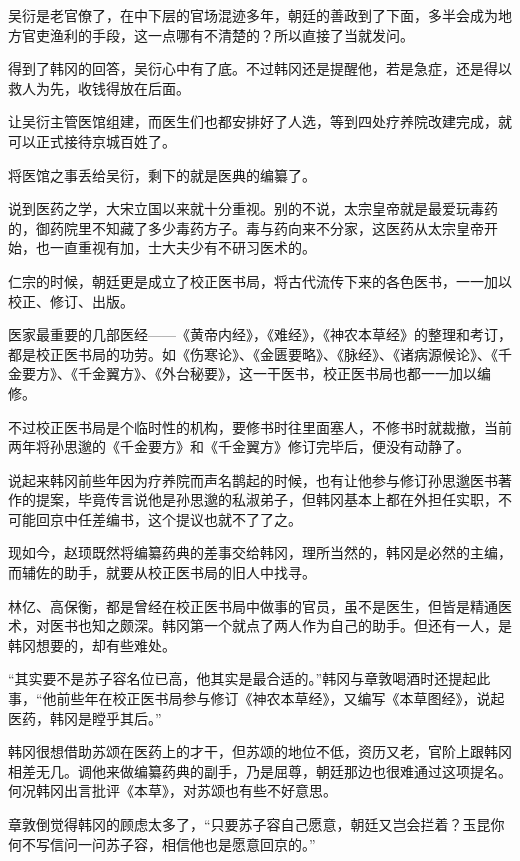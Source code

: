 吴衍是老官僚了，在中下层的官场混迹多年，朝廷的善政到了下面，多半会成为地方官吏渔利的手段，这一点哪有不清楚的？所以直接了当就发问。

得到了韩冈的回答，吴衍心中有了底。不过韩冈还是提醒他，若是急症，还是得以救人为先，收钱得放在后面。

让吴衍主管医馆组建，而医生们也都安排好了人选，等到四处疗养院改建完成，就可以正式接待京城百姓了。

将医馆之事丢给吴衍，剩下的就是医典的编纂了。

说到医药之学，大宋立国以来就十分重视。别的不说，太宗皇帝就是最爱玩毒药的，御药院里不知藏了多少毒药方子。毒与药向来不分家，这医药从太宗皇帝开始，也一直重视有加，士大夫少有不研习医术的。

仁宗的时候，朝廷更是成立了校正医书局，将古代流传下来的各色医书，一一加以校正、修订、出版。

医家最重要的几部医经——《黄帝内经》，《难经》，《神农本草经》的整理和考订，都是校正医书局的功劳。如《伤寒论》、《金匮要略》、《脉经》、《诸病源候论》、《千金要方》、《千金翼方》、《外台秘要》，这一干医书，校正医书局也都一一加以编修。

不过校正医书局是个临时性的机构，要修书时往里面塞人，不修书时就裁撤，当前两年将孙思邈的《千金要方》和《千金翼方》修订完毕后，便没有动静了。

说起来韩冈前些年因为疗养院而声名鹊起的时候，也有让他参与修订孙思邈医书著作的提案，毕竟传言说他是孙思邈的私淑弟子，但韩冈基本上都在外担任实职，不可能回京中任差编书，这个提议也就不了了之。

现如今，赵顼既然将编纂药典的差事交给韩冈，理所当然的，韩冈是必然的主编，而辅佐的助手，就要从校正医书局的旧人中找寻。

林亿、高保衡，都是曾经在校正医书局中做事的官员，虽不是医生，但皆是精通医术，对医书也知之颇深。韩冈第一个就点了两人作为自己的助手。但还有一人，是韩冈想要的，却有些难处。

“其实要不是苏子容名位已高，他其实是最合适的。”韩冈与章敦喝酒时还提起此事，“他前些年在校正医书局参与修订《神农本草经》，又编写《本草图经》，说起医药，韩冈是瞠乎其后。”

韩冈很想借助苏颂在医药上的才干，但苏颂的地位不低，资历又老，官阶上跟韩冈相差无几。调他来做编纂药典的副手，乃是屈尊，朝廷那边也很难通过这项提名。何况韩冈出言批评《本草》，对苏颂也有些不好意思。

章敦倒觉得韩冈的顾虑太多了，“只要苏子容自己愿意，朝廷又岂会拦着？玉昆你何不写信问一问苏子容，相信他也是愿意回京的。”

